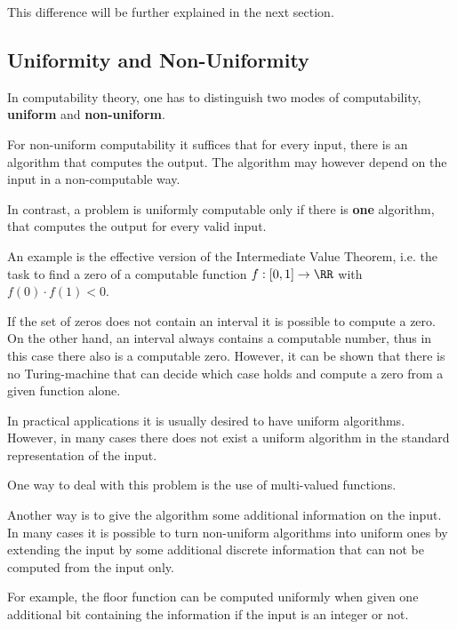 This difference will be further explained in the next section.
\subsection{Uniformity and Non-Uniformity}
In computability theory, one has to distinguish two modes of computability, \textbf{uniform} and \textbf{non-uniform}.

For non-uniform computability it suffices that for every input, there is an algorithm that computes the output. 
The algorithm may however depend on the input in a non-computable way.

In contrast, a problem is uniformly computable only if there is \textbf{one} algorithm, that computes the output for every valid input. 

An example is the effective version of the Intermediate Value Theorem, i.e. the
task to find a zero of a computable function $f : [0,1] \to \RR$ with
$f(0)\cdot f(1) < 0$.

If the set of zeros does not contain an interval it is possible to
compute a zero.
On the other hand, an interval always contains a computable number, thus in
this case there also is a computable zero.
However, it can be shown that there is no Turing-machine that can decide which
case holds and compute a zero from a given function alone.

In practical applications it is usually desired to have uniform algorithms.
However, in many cases there does not exist a uniform algorithm in the standard
representation of the input.

One way to deal with this problem is the use of multi-valued functions.

Another way is to give the algorithm some additional information on the input.
In many cases it is possible to turn non-uniform algorithms into uniform ones
by extending the input by some additional discrete information that can not be
computed from the input only.

For example, the floor function can be computed uniformly when given one
additional bit containing the information if the input is an integer or
not.  
